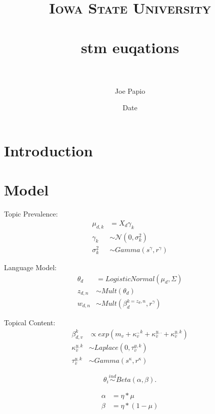 \documentclass[paper=letter, fontsize=12pt]{scrartcl} %
\title{	
\normalfont \normalsize 
\textsc{Iowa State University} \\ [25pt] %
\horrule{0.5pt} \\[0.4cm] %
\huge stm euqations \\ %
\horrule{2pt} \\[0.5cm] %
}
\author{Joe Papio} %
\date{\normalsize Date} %
\numberwithin{equation}{section} %
\numberwithin{figure}{section} %
\numberwithin{table}{section} %
\begin{document}
\maketitle %


\section{Introduction}






\section{Model}

\centering Topic Prevalence:
\begin{align*}
	\mu_{d,k} &= X_d\gamma_k \\
	\gamma_k &\sim \mathcal{N}(0,\sigma_k^2)\\
	\sigma_k^2 &\sim Gamma(s^{\gamma}, r^{\gamma})
\end{align*}

\centering Language Model:
\begin{align*}
\theta_{d} &= LogisticNormal(\mu_d, \Sigma) \\
z_{d,n} &\sim Mult(\theta_d)\\
w_{d,n} &\sim Mult(\beta^{k=z_d,n}_d, r^{\gamma})
\end{align*}

\centering Topical Content:
\begin{align*}
\beta_{d,v}^k &\propto exp(m_v+\kappa_v^{.,k}+\kappa_v^{y,.}+\kappa_v^{y,k}) \\
\kappa_v^{y,k} &\sim Laplace(0,\tau_v^{y,k})\\
\tau_v^{y,k} &\sim Gamma(s^{\kappa}, r^{\kappa})
\end{align*}


\begin{equation*}
\theta_i \stackrel{ind}{\sim} Beta(\alpha, \beta).
\end{equation*}

	\begin{align*}
	 \alpha &=\eta*\mu \\ 
	\beta &= \eta*(1-\mu) 
	\end{align*}
\end{document}
